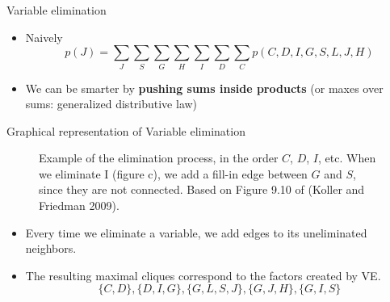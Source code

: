 \documentclass[10pt,mathserif]{beamer}
\begin{document}
\begin{frame}{Variable elimination}
\begin{itemize}
    \item Naively
    \begin{equation}
        p(J) = \sum_J\sum_S\sum_G\sum_H\sum_I\sum_D\sum_C
        p(C,D,I,G,S,L,J,H)
    \end{equation}
    \item We can be smarter by \textbf{pushing sums inside products} (or maxes over sums: generalized distributive law)
\end{itemize}
\end{frame}

\begin{frame}{Graphical representation of Variable elimination}
\begin{figure}[h]
\centering     %
{}

\caption{Example of the elimination process, in the order $C$, $D$, $I$, etc. When we eliminate I (figure c), we add a fill-in edge between $G$ and $S$, since they are not connected. Based on Figure 9.10 of (Koller and Friedman 2009).
}
\end{figure}

\begin{itemize}
    \item Every time we eliminate a variable, we add edges to its uneliminated neighbors.
    \item The resulting maximal cliques correspond to the factors created by VE.
    \begin{equation}
        \{C,D\},\{D,I,G\},\{G,L,S,J\},\{G,J,H\},\{G,I,S\}
    \end{equation}
\end{itemize}
\end{frame}
\end{document}
